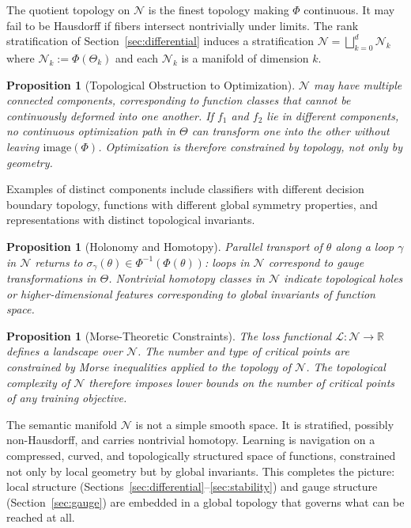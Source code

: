 \documentclass[twocolumn,10pt]{article}
\theoremstyle{thmstyle}
\newtheorem{proposition}[theorem]{Proposition}
\theoremstyle{defstyle}
\begin{document}
The quotient topology on $\mathcal{N}$ is the finest topology making
$\Phi$ continuous. It may fail to be Hausdorff if fibers intersect
nontrivially under limits. The rank stratification of
Section~\ref{sec:differential} induces a stratification
$\mathcal{N} = \bigsqcup_{k=0}^d \mathcal{N}_k$ where
$\mathcal{N}_k := \Phi(\Theta_k)$ and each $\mathcal{N}_k$ is a
manifold of dimension $k$.

\begin{proposition}[Topological Obstruction to Optimization]
$\mathcal{N}$ may have multiple connected components, corresponding to
function classes that cannot be continuously deformed into one another.
If $f_1$ and $f_2$ lie in different components, no continuous
optimization path in $\Theta$ can transform one into the other without
leaving $\mathrm{image}(\Phi)$. Optimization is therefore constrained
by topology, not only by geometry.
\end{proposition}

Examples of distinct components include classifiers with different
decision boundary topology, functions with different global symmetry
properties, and representations with distinct topological invariants.

\begin{proposition}[Holonomy and Homotopy]
Parallel transport of $\theta$ along a loop $\gamma$ in $\mathcal{N}$
returns to $\sigma_\gamma(\theta) \in \Phi^{-1}(\Phi(\theta))$:
loops in $\mathcal{N}$ correspond to gauge transformations in $\Theta$.
Nontrivial homotopy classes in $\mathcal{N}$ indicate topological holes
or higher-dimensional features corresponding to global invariants of
function space.
\end{proposition}

\begin{proposition}[Morse-Theoretic Constraints]
The loss functional $\mathcal{L} : \mathcal{N} \to \mathbb{R}$ defines
a landscape over $\mathcal{N}$. The number and type of critical points
are constrained by Morse inequalities applied to the topology of
$\mathcal{N}$. The topological complexity of $\mathcal{N}$ therefore
imposes lower bounds on the number of critical points of any training
objective.
\end{proposition}

The semantic manifold $\mathcal{N}$ is not a simple smooth space. It is
stratified, possibly non-Hausdorff, and carries nontrivial homotopy.
Learning is navigation on a compressed, curved, and topologically
structured space of functions, constrained not only by local geometry
but by global invariants. This completes the picture: local structure
(Sections~\ref{sec:differential}--\ref{sec:stability}) and gauge
structure (Section~\ref{sec:gauge}) are embedded in a global topology
that governs what can be reached at all.
\end{document}
